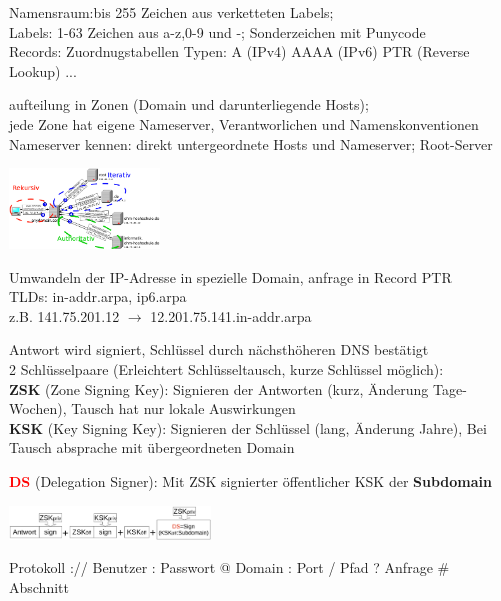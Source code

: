 
Namensraum:bis 255 Zeichen aus verketteten Labels; \\
Labels: 1-63 Zeichen aus a-z,0-9 und -; Sonderzeichen mit Punycode\\
Records: Zuordnugstabellen Typen: A (IPv4) AAAA (IPv6) PTR (Reverse Lookup) ...

 aufteilung in Zonen (Domain und darunterliegende Hosts); \\
jede Zone hat eigene Nameserver, Verantworlichen und Namenskonventionen\\
Nameserver kennen: direkt untergeordnete Hosts und Nameserver;  Root-Server


\includegraphics[width=0.3\textwidth]{DNS}

Umwandeln der IP-Adresse in spezielle Domain, anfrage in Record PTR\\
TLDs: in-addr.arpa, ip6.arpa\\
z.B. 141.75.201.12 $\rightarrow$ 12.201.75.141.in-addr.arpa 

Antwort wird signiert, Schlüssel durch nächsthöheren DNS bestätigt \\
2 Schlüsselpaare (Erleichtert Schlüsseltausch, kurze Schlüssel möglich):\\
\textbf{ZSK} (Zone Signing Key): Signieren der Antworten (kurz, Änderung Tage-Wochen), Tausch hat nur lokale Auswirkungen\\
\textbf{KSK} (Key Signing Key): Signieren der Schlüssel (lang, Änderung Jahre), Bei Tausch absprache mit übergeordneten Domain

\textcolor{red}{\textbf{DS}} (Delegation Signer): Mit ZSK signierter öffentlicher KSK der \textbf{Subdomain}

\includegraphics[width=0.4\textwidth]{DNSsec}

Protokoll :// Benutzer : Passwort @ Domain : Port / Pfad ? Anfrage \# Abschnitt